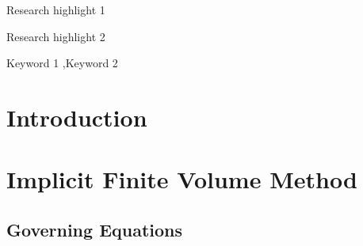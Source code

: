 \documentclass[preprint,12pt]{elsarticle}
\begin{document}
\begin{frontmatter}
    \begin{highlights}
        \item Research highlight 1
        \item Research highlight 2
    \end{highlights}

    \begin{keyword}

        Keyword 1 \sep Keyword 2



    \end{keyword}

\end{frontmatter}



\newcommand{\trans}{^\mathrm{T}}

\section{Introduction}
\label{sec:intro}


\section{Implicit Finite Volume Method}
\label{sec:CFV}

\newcommand{\U}{\mathbf{U}}
\newcommand{\F}{\mathbf{F}}
\newcommand{\x}{\mathbf{x}}
\newcommand{\OO}{\mathbf{\Omega}}
\newcommand{\UM}{\overline{\U}}
\newcommand{\Fn}{\tilde{\F}}
\newcommand{\n}{\mathbf{n}}
\newcommand{\uu}{\overline{\mathbf{U}}}
\newcommand{\R}{\mathbf{R}}
\newcommand{\inc}{\mathrm\Delta}
\newcommand{\Tau}{\mathrm{T}}
\renewcommand{\real}{\mathrm{Re}}
\newcommand{\imag}{\mathrm{Im}}

\newcommand{\CFLt}{\text{CFL}_t}
\newcommand{\CFLtau}{\text{CFL}_\tau}

\newcommand{\eeqref}[1]{Eq.\eqref{#1}}
\newcommand{\um}{\overline{u}}
\newcommand{\us}{\mathbf{u}}
\newcommand{\SAll}{\mathcal{S}}

\newcommand{\FF}{\mathcal{F}}

\newcommand{\eye}{\mathbf{I}}

\subsection{Governing Equations}
\label{ssec:GovEq}
\end{document}
